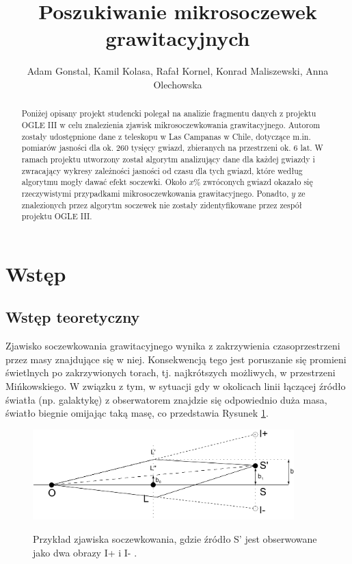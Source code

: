 \documentclass[a4paper,11pt]{article}
\author{Adam Gonstal, Kamil Kolasa, Rafał Kornel, Konrad Maliszewski, Anna Olechowska}
\title{Poszukiwanie mikrosoczewek grawitacyjnych}
\newcommand{\ak}{\hspace{0.7 cm}}
\begin{document}
\maketitle
\newpage
\tableofcontents
\newpage
\begin{abstract}
\nocite{*}
\ak Poniżej opisany projekt studencki polegał na analizie fragmentu danych z projektu OGLE III w celu znalezienia zjawisk mikrosoczewkowania grawitacyjnego.  Autorom zostały udostępnione dane z teleskopu w Las Campanas w Chile, dotyczące m.in. pomiarów jasności dla ok. $260$ tysięcy  gwiazd, zbieranych na przestrzeni ok. $6$ lat. W ramach projektu utworzony został algorytm analizujący dane dla każdej gwiazdy i zwracający wykresy zależności jasności od czasu dla tych gwiazd, które według algorytmu mogły dawać efekt soczewki. Około $x\%$ zwróconych gwiazd okazało się rzeczywistymi przypadkami mikrosoczewkowania grawitacyjnego. Ponadto, $y$ ze znalezionych przez algorytm soczewek nie zostały zidentyfikowane przez zespół projektu OGLE III.
\end{abstract}
\section{Wstęp}
\subsection{Wstęp teoretyczny}
\ak Zjawisko soczewkowania grawitacyjnego wynika z zakrzywienia czasoprzestrzeni przez masy znajdujące się w niej. Konsekwencją tego jest poruszanie się promieni świetlnych po zakrzywionych torach, tj. najkrótszych możliwych, w przestrzeni Mińkowskiego. W związku z tym, w sytuacji gdy w okolicach linii łączącej źródło światła (np. galaktykę) z obserwatorem znajdzie się odpowiednio duża masa, światło biegnie omijając taką masę, co przedstawia Rysunek \ref{Fig_1}. 

\begin{figure}[h]
\centering
\includegraphics[width=0.9\textwidth]{Fig/Lens.jpeg}
\label{Fig_1}
\caption{Przykład zjawiska soczewkowania, gdzie źródło S' jest obserwowane jako dwa obrazy I+ i I- \citet{Lens}.}
\end{figure}
\end{document}
